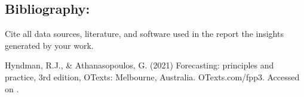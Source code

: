 \documentclass[11pt,a4paper,]{article}
\begin{document}
\subsection{Bibliography:}\label{bibliography}

Cite all data sources, literature, and software used in the report the insights generated by your work.

Hyndman, R.J., \& Athanasopoulos, G. (2021) Forecasting: principles and practice, 3rd edition, OTexts: Melbourne, Australia. OTexts.com/fpp3. Accessed on .

\printbibliography
\end{document}

